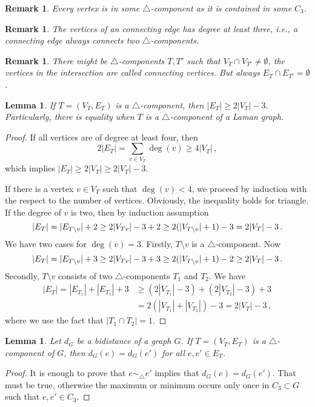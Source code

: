 \documentclass[a4paper, 11pt]{article}
\newcommand{\trcomp}{$\triangle$-component}
\newcommand{\trcomps}{$\triangle$-components}
\newtheorem{lem}[thm]{Lemma}
\newtheorem{rem}[thm]{Remark}
\theoremstyle{definition}
\begin{document}
\begin{rem}
Every vertex is in some \trcomp{} as it is contained in some $C_3$.
\end{rem}
\begin{rem}
The vertices of an connecting edge has degree at least three, i.e., a connecting edge always connects two \trcomps{}.
\end{rem}

\begin{rem}
There might be \trcomps{} $T,T'$ such that $V_T \cap V_{T'}\neq \emptyset$, the vertices in the intersection are called \emph{connecting vertices}. But always $E_T \cap E_{T'}= \emptyset$.
\end{rem}

\begin{lem}
If $T=(V_T, E_T)$ is a \trcomp{}, then $|E_T|\geq 2|V_T|-3$. Particularly, there is equality when $T$ is a \trcomp{} of a Laman graph.
\label{lem:sizeTriangleComponent}
\end{lem}
\begin{proof}
If all vertices are of degree at least four, then $$2|E_T|=\sum_{v\in V_T} \deg(v) \geq 4|V_T|\,,$$ which implies $|E_T|\geq 2|V_T|\geq 2|V_T|-3$.

If there is a vertex $v\in V_T$ such that $\deg(v)<4$, we proceed by induction with the respect to the number of vertices. Obviously, the inequality holds for triangle. If the degree of $v$ is two, then by induction assumption
$$
|E_T|=|E_{T\setminus v}|+2\geq 2 |V_{T\\v}|-3 +2\geq 2 (|V_{T\setminus v}|+1)-3=2 |V_{T}|-3\,.
$$
We have two cases for $\deg(v)=3$. Firstly, $T\setminus v$ is a \trcomp{}. Now $$|E_T|=|E_{T\setminus v}|+3\geq 2 |V_{T\\v}|-3 +3\geq 2 (|V_{T\setminus v}|+1)-2\geq 2 |V_{T}|-3\,.$$ Secondly, $T\setminus v$ consists of two \trcomps{} $T_1$ and $T_2$. We have
\begin{align*}
|E_T|=|E_{T_1}|+|E_{T_1}|+3 &\geq (2 |V_{T_1}|-3)+(2 |V_{T_2}|-3) +3 \\
			&= 2(|V_{T_1}| +|V_{T_2}|)-3=2 |V_{T}|-3\,,
\end{align*}
where we use the fact that $|T_1 \cap T_2|=1$.
\end{proof}

\begin{lem}
Let $d_G$ be a bidistance of a graph $G$. If $T=(V_T, E_T)$ is a \trcomp{} of $G$, then $d_G(e)=d_G(e')$ for all $e,e'\in E_T$.
\end{lem}
\begin{proof}
It is enough to prove that $e \sim_{\!\!\bigtriangleup} e'$ implies that $d_G(e)=d_G(e')$. That must be true, otherwise the maximum or minimum occurs only once in $C_3\subset G$ such that $e,e'\in C_3$.
\end{proof}
\end{document}
